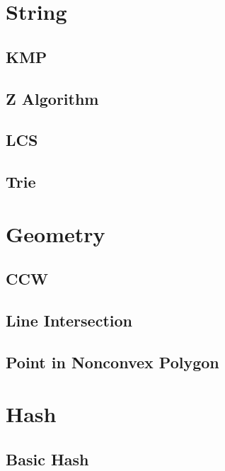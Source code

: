 \documentclass[9pt,landscape,a4paper,twocolumn]{extarticle}
\begin{document}
\section{String}

\subsection{KMP}


\subsection{Z Algorithm}


\subsection{LCS}


\subsection{Trie}


\section{Geometry}

\subsection{CCW}


\subsection{Line Intersection}


\subsection{Point in Nonconvex Polygon}


\section{Hash}

\subsection{Basic Hash}

\end{document}
